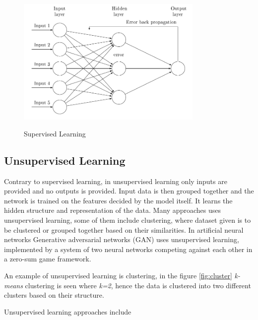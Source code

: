 \documentclass[12pt, a4paper]{report}
\begin{document}
\begin{figure}[h]
\centering	
\includegraphics[width=9cm]{supervised.png}\\
\caption{Supervised Learning}
\label{fig:supervised}
\end{figure} 


\subsection{Unsupervised Learning}\label{sec:unsupervised}

Contrary to supervised learning, in unsupervised learning only inputs are provided and no outputs is provided. Input data is then grouped together and the network is trained on the features decided by the model itself. It learns the hidden structure and representation of the data. 
Many approaches uses unsupervised learning, some of them include clustering, where dataset given is to be clustered or grouped together based on their similarities. In artificial neural networks Generative adversarial networks (GAN) uses unsupervised learning, implemented by a system of two neural networks competing against each other in a zero-sum game framework\cite{unsupervised}.\\ \par
An example of unsupervised learning is clustering, in the figure \ref{fig:cluster} \textit{k-means} clustering is seen where \textit{k=2}, hence the data is clustered into two different clusters based on their structure.\\ \par
Unsupervised learning approaches include
\end{document}
